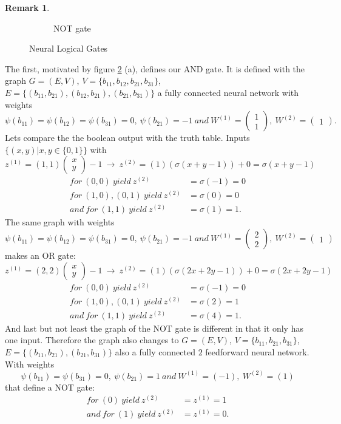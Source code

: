 \documentclass{article}
\theoremstyle{definition}
\newtheorem{remark}[theorem]{Remark}
\begin{document}
\begin{remark}
\begin{figure}[H]
\begin{subfigure}[b]{0.3\textwidth}
        \caption{NOT gate}
        \label{fig:NOT}
    \end{subfigure}
    \caption{Neural Logical Gates}\label{fig:neural_logic_gates}
\end{figure}
The first, motivated by figure \ref{fig:neural_logic_gates} (a), defines our AND gate. It is defined with the graph $G=(E, V)$, $V=\{ b_{11}, b_{12}, b_{21}, b_{31} \}$, $E=\{ (b_{11}, b_{21}), (b_{12}, b_{21}), (b_{21}, b_{31})\}$ a fully connected neural network with weights 
$$\psi(b_{11})=\psi(b_{12})=\psi(b_31)=0, \ \psi(b_{21})=-1 \ and \ W^{(1)}=\begin{pmatrix}1\\1\end{pmatrix}, \ W^{(2)}=\begin{pmatrix}1\end{pmatrix}.$$
Lets compare the the boolean output with the truth table. Inputs $\{(x, y)|x, y \in \{0, 1\}\}$ with
$$z^{(1)}=(1, 1)\begin{pmatrix}x\\y\end{pmatrix}-1 \ \to \ z^{(2)} = (1)(\sigma(x+y-1))+0 = \sigma(x+y-1)$$
\begin{align*}
for \ (0, 0) \ yield \ z^{(2)}&=\sigma(-1)=0 \\
for \ (1, 0), (0, 1) \ yield \ z^{(2)}&=\sigma(0)=0 \\
and \ for \ (1, 1) \ yield \ z^{(2)}&=\sigma(1)=1.
\end{align*}
The same graph with weights
$$\psi(b_{11})=\psi(b_{12})=\psi(b_31)=0, \ \psi(b_{21})=-1 \ and \ W^{(1)}=\begin{pmatrix}2\\2\end{pmatrix}, \ W^{(2)}=\begin{pmatrix}1\end{pmatrix}$$
makes an OR gate:
$$z^{(1)}=(2, 2)\begin{pmatrix}x\\y\end{pmatrix}-1 \ \to \ z^{(2)} = (1)(\sigma(2x+2y-1))+0 = \sigma(2x+2y-1)$$
\begin{align*}
for \ (0, 0) \ yield \ z^{(2)}&=\sigma(-1)=0 \\
for \ (1, 0), (0, 1) \ yield \ z^{(2)}&=\sigma(2)=1 \\
and \ for \ (1, 1) \ yield \ z^{(2)}&=\sigma(4)=1.
\end{align*}
And last but not least the graph of the NOT gate is different in that it only has one input. Therefore the graph also changes to $G=(E, V)$, $V=\{ b_{11}, b_{21}, b_{31} \}$, $E=\{ (b_{11}, b_{21}), (b_{21}, b_{31})\}$ also a fully connected $2$ feedforward neural network. With weights
$$\psi(b_{11})=\psi(b_31)=0, \ \psi(b_{21})=1 \ and \ W^{(1)}=(-1), \ W^{(2)}=(1)$$
that define a NOT gate:
\begin{align*}
for \ (0) \ yield \ z^{(2)}&= z^{(1)} = 1 \\
and \ for \ (1) \ yield \ z^{(2)}&= z^{(1)} = 0.
\end{align*}


\end{remark}
\end{document}
